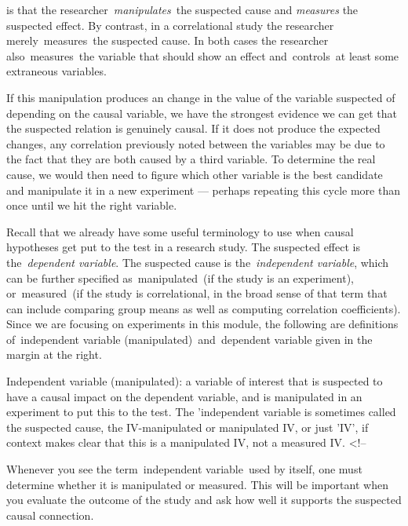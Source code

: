 \begin{refsection}
 is that the researcher \emph{manipulates} the suspected cause and \emph{measures} the suspected effect. By contrast, in a correlational study the researcher merely measures the suspected cause. In both cases the researcher also measures the variable that should show an effect and controls at least some extraneous variables. 

If this manipulation produces an change in the value of the variable suspected of depending on the causal variable, we have the strongest evidence we can get that the suspected relation is genuinely causal. If it does not produce the expected changes, any correlation previously noted between the variables may be due to the fact that they are both caused by a third variable. To determine the real cause, we would then need to figure which other variable is the best candidate and manipulate it in a new experiment --- perhaps repeating this cycle more than once until we hit the right variable.

Recall that we already have some useful terminology to use when causal hypotheses get put to the test in a research study. The suspected effect is the \emph{dependent variable}. The suspected cause is the \emph{independent variable}, which can be further specified as manipulated (if the study is an experiment), or measured (if the study is correlational, in the broad sense of that term that can include comparing group means as well as computing correlation coefficients). Since we are focusing on experiments in this module, the following are definitions of independent variable (manipulated) and dependent variable given in the margin at the right.

\begin{thesis}
Independent variable (manipulated): a variable of interest that is suspected to have a causal impact on the dependent variable, and is manipulated in an experiment to put this to the test.\newline
The 'independent variable is sometimes called the suspected cause, the IV-manipulated or manipulated IV, or just 'IV', if context makes clear that this is a manipulated IV, not a measured IV.
<!--\end{thesis}

Whenever you see the term independent variable used by itself, one must determine whether it is manipulated or measured. This will be important when you evaluate the outcome of the study and ask how well it supports the suspected causal connection.


\end{refsection}
